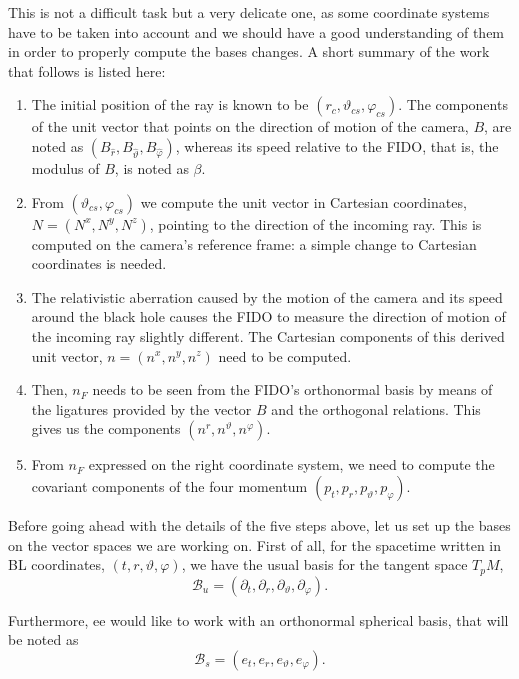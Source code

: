 This is not a difficult task but a very delicate one, as some coordinate systems have to be taken into account and we should have a good understanding of them in order to properly compute the bases changes. A short summary of the work that follows is listed here:
\begin{enumerate}
	\item The initial position of the ray is known to be $(r_c, \vartheta_{cs}, \varphi_{cs})$. The components of the unit vector that points on the direction of motion of the camera, $B$, are noted as $(B_{\widehat{r}}, B_{\widehat{\vartheta}}, B_{\widehat{\varphi}})$, whereas its speed relative to the \ac{FIDO}, that is, the modulus of $B$, is noted as $\beta$.
	\item From $(\vartheta_{cs}, \varphi_{cs})$ we compute the unit vector in Cartesian coordinates, $N = (N^x, N^y, N^z)$, pointing to the direction of the incoming ray. This is computed on the camera's reference frame: a simple change to Cartesian coordinates is needed.
	\item The relativistic aberration caused by the motion of the camera and its speed around the black hole causes the \ac{FIDO} to measure the direction of motion of the incoming ray slightly different. The Cartesian components of this derived unit vector, $n = (n^x, n^y, n^z)$ need to be computed.
	\item Then, $n_F$ needs to be seen from the \ac{FIDO}'s orthonormal basis by means of the ligatures provided by the vector $B$ and the orthogonal relations. This gives us the components $(n^r, n^\vartheta, n^\varphi)$.
	\item From $n_F$ expressed on the right coordinate system, we need to compute the covariant components of the four momentum $(p_t, p_r, p_\vartheta, p_\varphi)$.
\end{enumerate}

Before going ahead with the details of the five steps above, let us set up the bases on the vector spaces we are working on. First of all, for the spacetime written in \ac{BL} coordinates, $(t, r, \vartheta, \varphi)$, we have the usual basis for the tangent space $T_p M$,
\begin{equation}
	\mathcal{B}_u = (\partial_t, \partial_r, \partial_\vartheta, \partial_\varphi).
\end{equation}

Furthermore, ee would like to work with an orthonormal spherical basis, that will be noted as
\begin{equation}
	\mathcal{B}_s = (e_t, e_r, e_\vartheta, e_\varphi).
\end{equation}

